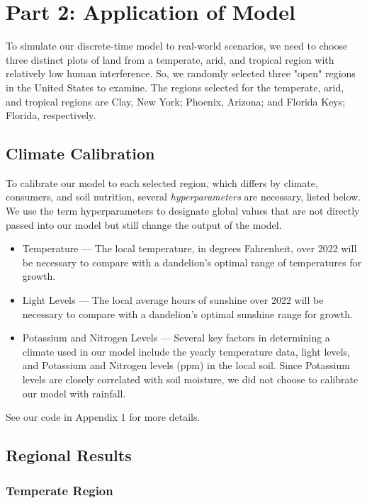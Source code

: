 \section{Part 2: Application of Model}

To simulate our discrete-time model to real-world scenarios, we need to choose three distinct plots of land from a temperate, arid, and tropical region with relatively low human interference. So, we randomly selected three 
"open" regions in the United States to examine. The regions selected for the temperate, arid, and tropical regions are Clay, New York; Phoenix, Arizona; and Florida Keys; Florida, respectively.

\subsection{Climate Calibration}

To calibrate our model to each selected region, which differs by climate, consumers, and soil nutrition, several \textit{hyperparameters} are necessary, listed below. We use the term hyperparameters to designate global values that are not directly passed into our model but still change the output of the model. 

\begin{itemize}
    \item Temperature — The local temperature, in degrees Fahrenheit, over 2022 will be necessary to compare with a dandelion's optimal range of temperatures for growth.
    \item Light Levels — The local average hours of sunshine over 2022 will be necessary to compare with a dandelion's optimal sunshine range for growth.
    \item Potassium and Nitrogen Levels — Several key factors in determining a climate used in our model include the yearly temperature data, light levels, and Potassium and Nitrogen levels (ppm) in the local soil. Since Potassium levels are closely correlated with soil moisture, we did not choose to calibrate our model with rainfall.    
\end{itemize}

See our code in Appendix 1 for more details. 

\subsection{Regional Results}

\subsubsection{Temperate Region}

